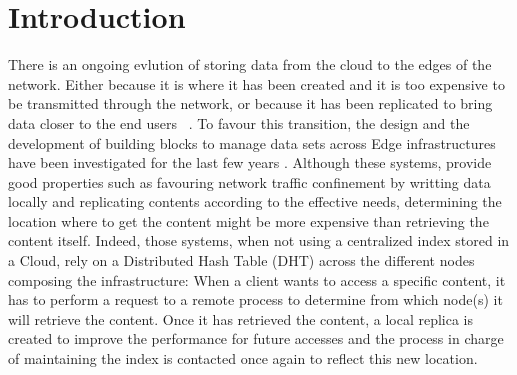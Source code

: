 
\section{Introduction}


There is an ongoing evlution of storing data from the cloud to the
edges of the network. Either because it is where it has been created
and it is too expensive to be transmitted through the network, or
because it has been replicated to bring data closer to the end users
~\cite{shi2016edge, foggy_cache, cachier}.
%
To favour this transition, the design and the development of building
blocks to manage data sets across Edge infrastructures have been
investigated for the last few years \cite{confais2017performance,
  confais2017object, fogstore, hasenburg2020towards}.  Although these
systems, provide good properties such as favouring network traffic
confinement by writting data locally and replicating contents
according to the effective needs, determining the location where to
get the content might be more expensive than retrieving the content
itself.
%
Indeed, those systems, when not using a centralized index stored in a
Cloud, rely on a Distributed Hash Table (DHT) across the different
nodes composing the infrastructure: When a client wants to access a
specific content, it has to perform a request to a remote process to
determine from which node(s) it will retrieve the content.  Once it has
retrieved the content, a local replica
is created to improve the performance for future accesses and the
process in charge of maintaining the index is contacted once again to reflect this
new location.
%


